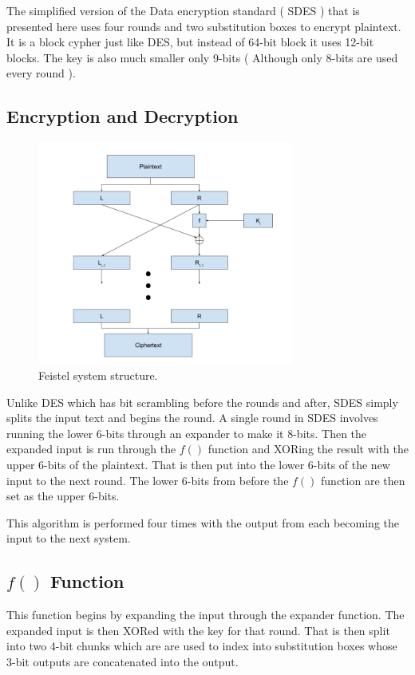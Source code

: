The simplified version of the Data encryption standard ( SDES ) that is presented here uses four rounds and two substitution boxes to encrypt plaintext.
It is a block cypher just like DES, but instead of 64-bit block it uses 12-bit blocks. 
The key is also much smaller only 9-bits ( Although only 8-bits are used every round ).

\subsection{Encryption and Decryption}

\begin{figure}[ht]
\begin{center}
\includegraphics[width=0.75\textwidth]{./SDESflow}
\end{center}
\caption{Feistel system structure.}
\end{figure}

Unlike DES which has bit scrambling before the rounds and after, SDES simply splits the input text and begins the round.
A single round in SDES involves running the lower 6-bits through an expander to make it 8-bits.
Then the expanded input is run through the $f()$ function and XORing the result with the upper 6-bits of the plaintext.
That is then put into the lower 6-bits of the new input to the next round. The lower 6-bits from before the $f()$ function are then set as the upper 6-bits.

This algorithm is performed four times with the output from each becoming the input to the next system.

\subsection{$f()$ Function}
This function begins by expanding the input through the expander function.
The expanded input is then XORed with the key for that round.
That is then split into two 4-bit chunks which are are used to index into substitution boxes whose 3-bit outputs are concatenated into the output.

